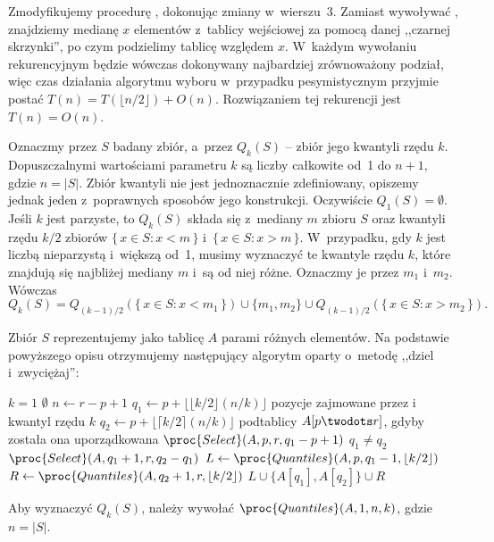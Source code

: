 \exercise %
Zmodyfikujemy procedurę , dokonując zmiany w~wierszu~3.
Zamiast wywoływać , znajdziemy medianę $x$ elementów z~tablicy wejściowej za pomocą danej ,,czarnej skrzynki'', po czym podzielimy tablicę względem $x$.
W~każdym wywołaniu rekurencyjnym będzie wówczas dokonywany najbardziej zrównoważony podział, więc czas działania algorytmu wyboru w~przypadku pesymistycznym przyjmie postać $T(n)=T(\lfloor n/2\rfloor)+O(n)$.
Rozwiązaniem tej rekurencji jest $T(n)=O(n)$.

\exercise %
Oznaczmy przez $S$ badany zbiór, a~przez $Q_k(S)$ -- zbiór jego kwantyli rzędu $k$.
Dopuszczalnymi wartościami parametru $k$ są liczby całkowite od~1 do $n+1$, gdzie $n=|S|$.
Zbiór kwantyli nie jest jednoznacznie zdefiniowany, opiszemy jednak jeden z~poprawnych sposobów jego konstrukcji.
Oczywiście $Q_1(S)=\emptyset$.
Jeśli $k$ jest parzyste, to $Q_k(S)$ składa się z~mediany $m$ zbioru $S$ oraz kwantyli rzędu $k/2$ zbiorów $\{\,x\in S:x<m\,\}$ i~$\{\,x\in S:x>m\,\}$.
W~przypadku, gdy $k$ jest liczbą nieparzystą i~większą od~1, musimy wyznaczyć te kwantyle rzędu $k$, które znajdują się najbliżej mediany $m$ i~są od niej różne.
Oznaczmy je przez $m_1$ i~$m_2$.
Wówczas
\[
	Q_k(S) = Q_{(k-1)/2}(\{\,x\in S:x<m_1\,\})\cup\{m_1,m_2\}\cup Q_{(k-1)/2}(\{\,x\in S:x>m_2\,\}).
\]

Zbiór $S$ reprezentujemy jako tablicę $A$ parami różnych elementów.
Na podstawie powyższego opisu otrzymujemy następujący algorytm oparty o~metodę ,,dziel i~zwyciężaj'':
\begin{codebox}
\li	\If $k=1$
\li		\Then \Return $\emptyset$
		\End
\li	$n\gets r-p+1$
\li	$q_1\gets p+\lfloor\lfloor k/2\rfloor(n/k)\rfloor$ \>\>\>\>\>\>\Comment pozycje zajmowane przez  i~ kwantyl rzędu $k$
\li	$q_2\gets p+\lfloor\lceil k/2\rceil(n/k)\rfloor$ \>\>\>\>\>\>\>podtablicy $A[p\twodots r]$, gdyby została ona uporządkowana
\li	$\proc{Select}(A,p,r,q_1-p+1)$
\li	\If $q_1\ne q_2$
\li		\Then $\proc{Select}(A,q_1+1,r,q_2-q_1)$ \label{li:quantiles-second-select}
		\End
\li	$L\gets\proc{Quantiles}(A,p,q_1-1,\lfloor k/2\rfloor)$
\li	$R\gets\proc{Quantiles}(A,q_2+1,r,\lfloor k/2\rfloor)$
\li	\Return $L\cup\{A[q_1],A[q_2]\}\cup R$
\end{codebox}
Aby wyznaczyć $Q_k(S)$, należy wywołać $\proc{Quantiles}(A,1,n,k)$, gdzie $n=|S|$.

